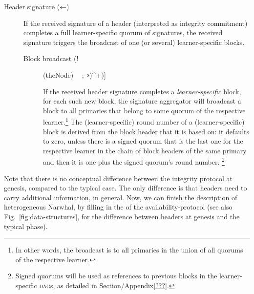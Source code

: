 \documentclass[dvipsnames]{article}
\theoremstyle{definition}
\newcommand{\xnote}[1]{
  \marginnote{\footnotesize #1}%
}
\newcommand{\Dag}[1][]{\textsc{dag}#1\xspace}
\newcommand{\fig}[1][]{Fig.~}
\newcommand{\bk}[1][green!60!black]{\tikz[baseline={([yshift=0pt]theNode.base)}]{\node[regular polygon, regular polygon sides=6
,double,inner sep=.5pt,outer sep=0pt,fill=#1] (theNode){\textcolor{white}{\footnotesize \bf bk}};}}
\newcommand{\hd}[1][ ]{%
  \ifthenelse{\equal{#1}{}}%
  {\tikz[baseline={([yshift=0pt]theNode.base)}]{
      \node[rectangle,inner sep=1.5pt,outer sep=0pt,double] (theNode){\textcolor{black}{\footnotesize \bf \ul{HD}}};
    }}%
  {\tikz[baseline={([yshift=0pt]theNode.base)}]{
      \node[rectangle,double,inner sep=1.5pt,outer sep=0pt,double,draw] (theNode){\textcolor{black}{\footnotesize \bf HD}};
     
    }}%
}
\begin{document}
\begin{description}
\item[Header signature (←)]
  \xnote{%
    primary\\
    ←primary
  }
  If the received signature of a header
  (interpreted as {integrity commitment})
  completes a full 
learner-specific quorum of signatures, 
  the received signature triggers the broadcast of one (or several) learner-specific blocks.

  \begin{description}
  \item[Block broadcast (!\((\bk⇒)^+\))]
    \xnote{%
      primary \\
      ⇒ primary
    }
    If the received header signature 
    completes a \emph{learner-specific} block, 
    for each such new block, %
    the signature aggregator will broadcast a block
    to all primaries that belong to some quorum of the respective
    learner.\footnote{%
      In other words, 
      the broadcast is to  all primaries in the union of all quorums of
      the respective learner. 
    }
    The (learner-specific) round number of a (learner-specific) block 
    is derived from the block header that it is based on: 
    it defaults to zero, 
    unless there is a signed quorum that is the last one for the respective learner
    in the chain of block headers of the same primary
    and
    then it is one plus the signed quorum's round number.\xspace%
    \footnote{%
      Signed quorums will be used as references to previous blocks in %
      the learner-specific \Dag[s],
      as detailed in Section/Appendix\ref{???}. %
    }
  \end{description}

\end{description}

Note that there is no conceptual difference between
the integrity protocol at genesis,
compared to the typical case.
The only difference is that headers need to carry 
additional information, in general.
Now, 
we can finish the description of heterogeneous Narwhal,
by filling in the of the availability-protocol
(see also \fig\ref{fig:data-structures},
for the difference between headers at genesis and the typical phase).
\end{document}
